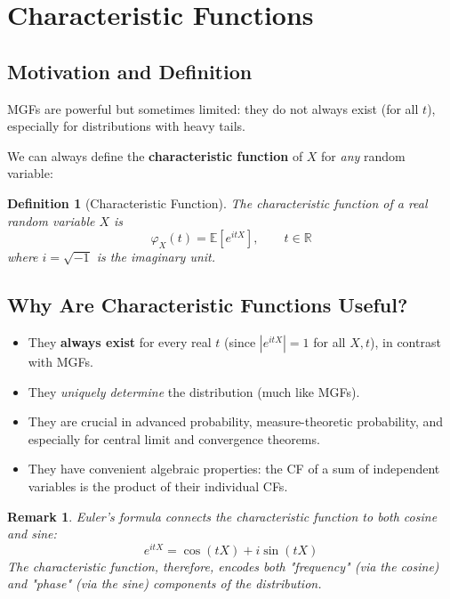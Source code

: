 \documentclass[12pt]{article}
\newtheorem{definition}[theorem]{Definition}
\newtheorem{remark}[theorem]{Remark}
\begin{document}
\section{Characteristic Functions}

\subsection{Motivation and Definition}
MGFs are powerful but sometimes limited: they do not always exist (for all $t$), especially for distributions with heavy tails.

We can always define the \textbf{characteristic function} of $X$ for \emph{any} random variable:

\begin{definition}[Characteristic Function]
    The characteristic function of a real random variable $X$ is
    \[
      \varphi_X(t) = \mathbb{E}[e^{itX}], \qquad t \in \mathbb{R}
    \]
    where $i = \sqrt{-1}$ is the imaginary unit.
\end{definition}

\subsection{Why Are Characteristic Functions Useful?}
\begin{itemize}
    \item They \textbf{always exist} for every real $t$ (since $|e^{itX}|=1$ for all $X,t$), in contrast with MGFs.
    \item They \emph{uniquely determine} the distribution (much like MGFs).
    \item They are crucial in advanced probability, measure-theoretic probability, and especially for central limit and convergence theorems.
    \item They have convenient algebraic properties: the CF of a sum of independent variables is the product of their individual CFs.
\end{itemize}

\begin{remark}
    Euler's formula connects the characteristic function to both cosine and sine:
    \[
        e^{itX} = \cos(tX) + i \sin(tX)
    \]
    The characteristic function, therefore, encodes both "frequency" (via the cosine) and "phase" (via the sine) components of the distribution.
\end{remark}

\end{document}
